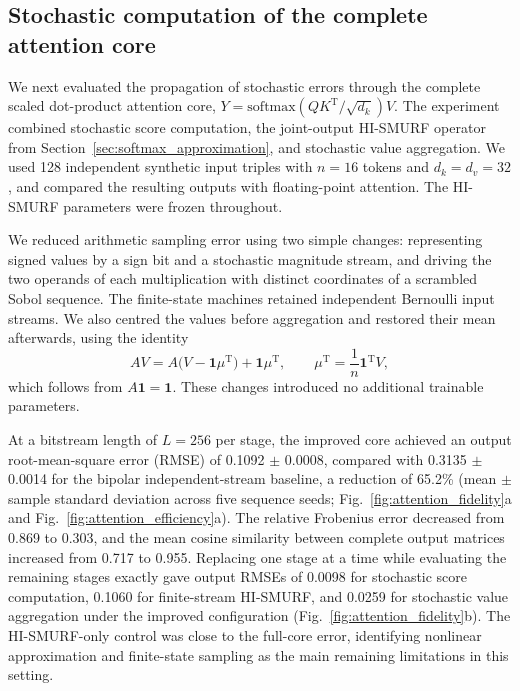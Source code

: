 \subsection{Stochastic computation of the complete attention core}
\label{sec:sc_attention}

We next evaluated the propagation of stochastic errors through the complete
scaled dot-product attention core,
$Y=\mathrm{softmax}(QK^{\mathrm T}/\sqrt{d_k})V$.
The experiment combined stochastic score computation, the joint-output
HI-SMURF operator from Section~\ref{sec:softmax_approximation}, and stochastic
value aggregation. We used 128 independent synthetic input triples with
$n=16$ tokens and $d_k=d_v=32$, and compared the resulting outputs with
floating-point attention. The HI-SMURF parameters were frozen throughout.

We reduced arithmetic sampling error using two simple changes: representing
signed values by a sign bit and a stochastic magnitude stream, and driving
the two operands of each multiplication with distinct coordinates of a
scrambled Sobol sequence. The finite-state machines retained independent
Bernoulli input streams. We also centred the values before aggregation and
restored their mean afterwards, using the identity
\begin{equation}
AV=A\bigl(V-\mathbf{1}\mu^{\mathrm T}\bigr)
   +\mathbf{1}\mu^{\mathrm T},
\qquad
\mu^{\mathrm T}=\frac{1}{n}\mathbf{1}^{\mathrm T}V,
\label{eq:attention_value_centering}
\end{equation}
which follows from $A\mathbf{1}=\mathbf{1}$. These changes introduced no
additional trainable parameters.

At a bitstream length of $L=256$ per stage, the improved core achieved an
output root-mean-square error (RMSE) of
0.1092 $\pm$ 0.0008, compared with 0.3135 $\pm$ 0.0014
for the bipolar independent-stream baseline, a reduction of 65.2\%
(mean $\pm$ sample standard deviation across five sequence seeds;
Fig.~\ref{fig:attention_fidelity}a and Fig.~\ref{fig:attention_efficiency}a).
The relative Frobenius error decreased from 0.869 to 0.303,
and the mean cosine similarity between complete output matrices increased
from 0.717 to 0.955. Replacing one stage at a time while evaluating
the remaining stages exactly gave output RMSEs of 0.0098 for stochastic
score computation, 0.1060 for finite-stream HI-SMURF, and 0.0259 for
stochastic value aggregation under the improved configuration
(Fig.~\ref{fig:attention_fidelity}b). The HI-SMURF-only control was close
to the full-core error, identifying nonlinear approximation and finite-state
sampling as the main remaining limitations in this setting.


